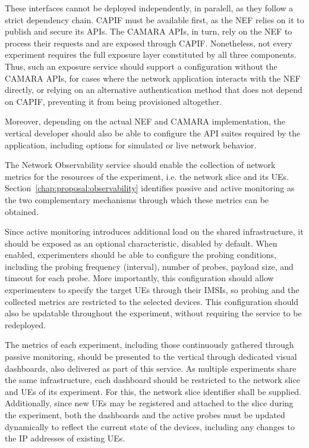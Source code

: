 These interfaces cannot be deployed independently, in paralell, as they follow a strict dependency chain. \acs{CAPIF} must be available first, as the \acs{NEF} relies on it to publish and secure its \acsp{API}. The CAMARA \acsp{API}, in turn, rely on the \acs{NEF} to process their requests and are exposed through \acs{CAPIF}. Nonetheless, not every experiment requires the full exposure layer constituted by all three components. Thus, such an exposure service should support a configuration without the CAMARA \acsp{API}, for cases where the network application interacts with the \acs{NEF} directly, or relying on an alternative authentication method that does not depend on \acs{CAPIF}, preventing it from being provisioned altogether.

Moreover, depending on the actual \acs{NEF} and CAMARA implementation, the vertical developer should also be able to configure the \acs{API} suites required by the application, including options for simulated or live network behavior.



The Network Observability service should enable the collection of network metrics for the resources of the experiment, i.e. the network slice and its \acsp{UE}. Section~\ref{chap:proposal:observability} identifies passive and active monitoring as the two complementary mechanisms through which these metrics can be obtained.

Since active monitoring introduces additional load on the shared infrastructure, it should be exposed as an optional characteristic, disabled by default. When enabled, experimenters should be able to configure the probing conditions, including the probing frequency (interval), number of probes, payload size, and timeout for each probe. More importantly, this configuration should allow experimenters to specify the target \acsp{UE} through their \acsp{IMSI}, so probing and the collected metrics are restricted to the selected devices. This configuration should also be updatable throughout the experiment, without requiring the service to be redeployed.

The metrics of each experiment, including those continuously gathered through passive monitoring, should be presented to the vertical through dedicated visual dashboards, also delivered as part of this service. As multiple experiments share the same infrastructure, each dashboard should be restricted to the network slice and \acsp{UE} of its experiment. For this, the network slice identifier shall be supplied. Additionally, since new \acsp{UE} may be registered and attached to the slice during the experiment, both the dashboards and the active probes must be updated dynamically to reflect the current state of the devices, including any changes to the \acs{IP} addresses of existing \acsp{UE}.


